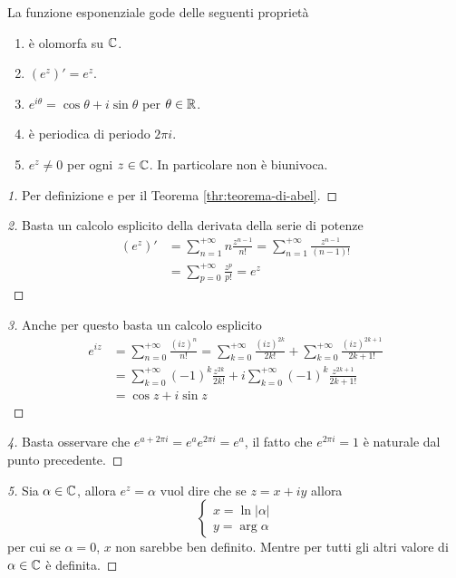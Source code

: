 \begin{theorem}
	La funzione esponenziale gode delle seguenti proprietà
	\begin{enumerate}
		\item è olomorfa su $\mathbb{C}$.
		\item $(e^z)' = e^z$.
		\item $e^{i\theta} = \cos \theta + i\sin \theta$ per $\theta \in \mathbb{R}$.
		\item è periodica di periodo $2\pi i$.
		\item $e^z \neq 0$ per ogni $z \in \mathbb{C}$. In particolare non è biunivoca.
	\end{enumerate}
\end{theorem}
\begin{proof}[1]
	Per definizione e per il Teorema \ref{thr:teorema-di-abel}.
\end{proof}
\begin{proof}[2]
	Basta un calcolo esplicito della derivata della serie di potenze
	\begin{equation}
	\begin{aligned}
		(e^z)' & = \sum^{+\infty}_{n=1} n\frac{z^{n-1}}{n!} = \sum^{+\infty}_{n=1} \frac{z^{n-1}}{(n-1)!} \\
				& = \sum^{+\infty}_{p=0} \frac{z^p}{p!} = e^z 
	\end{aligned}
	\end{equation}
\end{proof}
\begin{proof}[3]
	Anche per questo basta un calcolo esplicito
	\begin{equation}
	\begin{aligned}
		e^{iz} & = \sum^{+\infty}_{n=0} \frac{(iz)^{n}}{n!} = \sum^{+\infty}_{k=0} \frac{(iz)^{2k}}{2k!} + \sum^{+\infty}_{k=0} \frac{(iz)^{2k+1}}{2k+1!}\\
			& = \sum^{+\infty}_{k=0} (-1)^k\frac{z^{2k}}{2k!} + i\sum^{+\infty}_{k=0} (-1)^k\frac{z^{2k+1}}{2k+1!}\\
			& = \cos z + i \sin z
	\end{aligned}
	\end{equation}
\end{proof}
\begin{proof}[4]
	Basta osservare che $e^{a + 2\pi i} = e^a e^{2\pi i } = e^a$, il fatto che $e^{2\pi i} = 1$ è naturale dal punto precedente.
\end{proof}
\begin{proof}[5]
	Sia $\alpha \in \mathbb{C}$, allora $e^z = \alpha$ vuol dire che se $z = x+iy$ allora 
	\begin{equation}
	\begin{cases}
		x = \ln |\alpha|\\
		y = \arg \alpha
	\end{cases}
	\end{equation}
	per cui se $\alpha = 0$, $x$ non sarebbe ben definito. Mentre per tutti gli altri valore di $\alpha \in \mathbb{C}$ è definita.
\end{proof}

